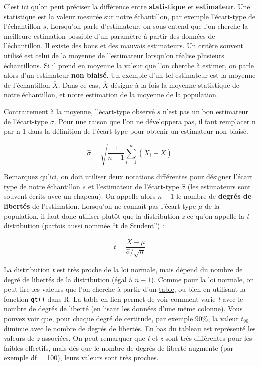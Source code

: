 \documentclass[
  french,
]{book}
\begin{document}
C'est ici qu'on peut préciser la différence entre \textbf{statistique} et \textbf{estimateur}. Une statistique est la valeur mesurée sur notre échantillon, par exemple l'écart-type de l'échantillon \(s\). Lorsqu'on parle d'estimateur, on sous-entend que l'on cherche la meilleure estimation possible d'un paramètre à partir des données de l'échantillon. Il existe des bons et des mauvais estimateurs. Un critère souvent utilisé est celui de la moyenne de l'estimateur lorsqu'on réalise plusieurs échantillons. Si il prend en moyenne la valeur que l'on cherche à estimer, on parle alors d'un estimateur \textbf{non biaisé}. Un exemple d'un tel estimateur est la moyenne de l'échantillon \(\overline{X}\). Dans ce cas, \(\overline{X}\) désigne à la fois la moyenne statistique de notre échantillon, et notre estimation de la moyenne de la population.

Contrairement à la moyenne, l'écart-type observé \(s\) n'est pas un bon estimateur de l'écart-type \(\sigma\). Pour une raison que l'on ne développera pas, il faut remplacer n par n-1 dans la définition de l'écart-type pour obtenir un estimateur non biaisé.

\[ \hat{\sigma} = \sqrt{\frac{1}{n-1}\sum_{i=1}^n{(X_i - \overline{X})}}\]

Remarquez qu'ici, on doit utiliser deux notations différentes pour désigner l'écart type de notre échantillon \(s\) et l'estimateur de l'écart-type \(\hat{\sigma}\) (les estimateurs sont souvent écrits avec un chapeau). On appelle alors \(n-1\) le nombre de \textbf{degrés de libertés} de l'estimation. Lorsqu'on ne connaît pas l'écart-type \(\mu\) de la population, il faut donc utiliser plutôt que la distribution \emph{z} ce qu'on appelle la \emph{t}-distribution (parfois aussi nommée ``t de Student'') :

\[ t = \frac{\overline{X} - \mu}{\hat{\sigma}/\sqrt{n}}\]

La distribution \emph{t} est très proche de la loi normale, mais dépend du nombre de degré de libertés de la distribution (égal à \(n-1\)). Comme pour la loi normale, on peut lire les valeurs que l'on cherche à partir d'un \href{https://www.sjsu.edu/faculty/gerstman/StatPrimer/t-table.pdf}{table}, ou bien en utilisant la fonction \texttt{qt()} dans R. La table en lien permet de voir comment varie \emph{t} avec le nombre de degrés de liberté (en lisant les données d'une même colonne). Vous pouvez voir que, pour chaque degré de certitude, par exemple 90\%, la valeur \(t_{90}\) diminue avec le nombre de degrés de libertés. En bas du tableau est représenté les valeurs de \emph{z} associées. On peut remarquer que \emph{t} et \emph{z} sont très différentes pour les faibles effectifs, mais dès que le nombre de degrés de liberté augmente (par exemple df = 100), leurs valeurs sont très proches.
\end{document}
